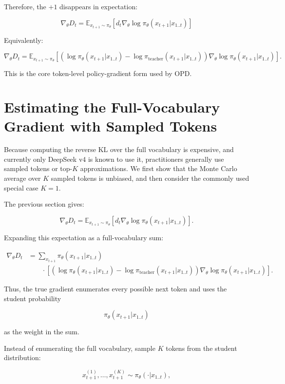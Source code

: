 \documentclass[11pt,a4paper]{article}
\begin{document}
Therefore, the $+1$ disappears in expectation:

\[
\boxed{
\nabla_\theta D_t
=
\mathbb E_{x_{t+1}\sim\pi_\theta}
\left[
d_t
\nabla_\theta\log\pi_\theta(x_{t+1}|x_{1..t})
\right]
}
\]

Equivalently:

\[
\boxed{
\nabla_\theta D_t
=
\mathbb E_{x_{t+1}\sim\pi_\theta}
\left[
\left(
\log\pi_\theta(x_{t+1}|x_{1..t})
-
\log\pi_{\text{teacher}}(x_{t+1}|x_{1..t})
\right)
\nabla_\theta\log\pi_\theta(x_{t+1}|x_{1..t})
\right].
}
\]

This is the core token-level policy-gradient form used by OPD.

\section{Estimating the Full-Vocabulary Gradient with Sampled Tokens}

Because computing the reverse KL over the full vocabulary is expensive, and currently only DeepSeek v4 is known to use it, practitioners generally use sampled tokens or top-$K$ approximations. We first show that the Monte Carlo average over $K$ sampled tokens is unbiased, and then consider the commonly used special case $K=1$.

The previous section gives:

\[
\boxed{
\nabla_\theta D_t
=
\mathbb E_{x_{t+1}\sim\pi_\theta}
\left[
d_t\nabla_\theta\log\pi_\theta(x_{t+1}|x_{1..t})
\right].
}
\]

Expanding this expectation as a full-vocabulary sum:

\[
\begin{aligned}
\nabla_\theta D_t
&=
\sum_{x_{t+1}}
\pi_\theta(x_{t+1}|x_{1..t})\\
&\qquad\cdot
\left[
\left(
\log\pi_\theta(x_{t+1}|x_{1..t})
-
\log\pi_{\text{teacher}}(x_{t+1}|x_{1..t})
\right)
\nabla_\theta\log\pi_\theta(x_{t+1}|x_{1..t})
\right].
\end{aligned}
\]

Thus, the true gradient enumerates every possible next token and uses the student probability

\[
\pi_\theta(x_{t+1}|x_{1..t})
\]

as the weight in the sum.

Instead of enumerating the full vocabulary, sample $K$ tokens from the student distribution:

\[
x_{t+1}^{(1)},\ldots,x_{t+1}^{(K)}
\sim
\pi_\theta(\cdot|x_{1..t}),
\]
\end{document}
